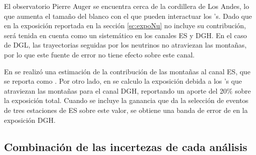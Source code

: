 	El observatorio Pierre Auger se encuentra cerca de la cordillera de Los Andes, lo que aumenta el tamaño del blanco con el que pueden interactuar los \nutau{}'s.
	Dado que en la exposición reportada en la sección \ref{sc:expoNu} no incluye su contribución, será tenida en cuenta como un sistemático en los canales ES y DGH.
	En el caso de DGL, las trayectorias seguidas por los neutrinos no atraviezan las montañas, por lo que este fuente de error no tiene efecto sobre este canal.
	
	En \cite{prd2009} se realizó una estimación de la contribución de las montañas al canal ES, que se reporta como .
	Por otro lado, en \cite{dghPaper} se calculo la exposición debida a los \tauon{}'s que atraviezan las montañas para el canal DGH, reportando un aporte del 20$\%$ sobre la exposición total. 
	Cuando se incluye la ganancia que da la selección de eventos de tres estaciones de ES sobre este valor, se obtiene una banda de error de  en la exposición DGH.
	
	
	\subsection{Combinación de las incertezas de cada análisis}
	
